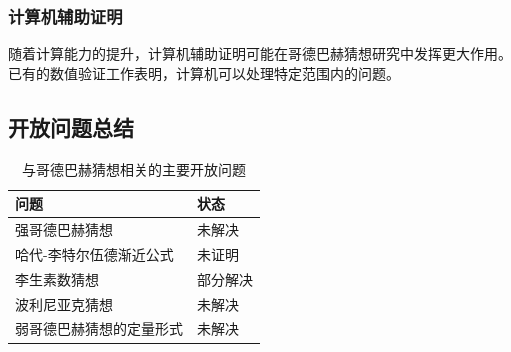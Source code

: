 \subsubsection{计算机辅助证明}

随着计算能力的提升，计算机辅助证明可能在哥德巴赫猜想研究中发挥更大作用。已有的数值验证工作表明，计算机可以处理特定范围内的问题。

\subsection{开放问题总结}

\begin{table}[htbp]
    \centering
    \caption{与哥德巴赫猜想相关的主要开放问题}
    \label{tab:open_problems}
    \begin{tabular}{@{}ll@{}}
        \toprule
        \textbf{问题} & \textbf{状态} \\
        \midrule
        强哥德巴赫猜想 & 未解决 \\
        哈代-李特尔伍德渐近公式 & 未证明 \\
        李生素数猜想 & 部分解决 \\
        波利尼亚克猜想 & 未解决 \\
        弱哥德巴赫猜想的定量形式 & 未解决 \\
        \bottomrule
    \end{tabular}
\end{table}
